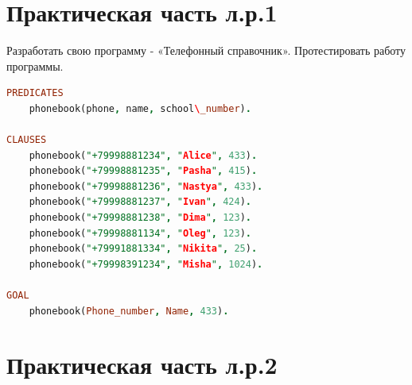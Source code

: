 \documentclass[a4paper,oneside,12pt]{extreport}
\begin{document}
\section*{Практическая часть л.р.1}

\begin{task}
    Разработать свою программу - «Телефонный справочник».
    Протестировать работу программы.
    \begin{lstlisting}[language=Prolog]
PREDICATES
	phonebook(phone, name, school\_number).

CLAUSES 
	phonebook("+79998881234", "Alice", 433).
	phonebook("+79998881235", "Pasha", 415).
	phonebook("+79998881236", "Nastya", 433).
	phonebook("+79998881237", "Ivan", 424).
	phonebook("+79998881238", "Dima", 123).
	phonebook("+79998881134", "Oleg", 123).
	phonebook("+79991881334", "Nikita", 25).
	phonebook("+79998391234", "Misha", 1024).

GOAL
	phonebook(Phone_number, Name, 433).
    \end{lstlisting}
\end{task}

\section*{Практическая часть л.р.2}
\end{document}
